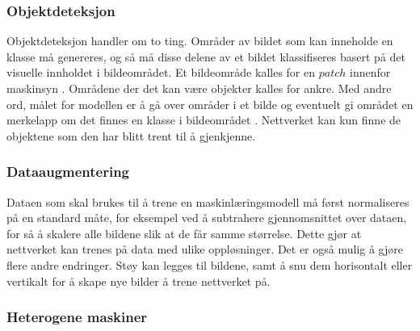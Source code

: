 \subsubsection{Objektdeteksjon}

Objektdeteksjon handler om to ting. Områder av bildet som kan inneholde en klasse må genereres, og så må disse delene av et bildet klassifiseres basert på det visuelle innholdet i bildeområdet. Et bildeområde kalles for en $patch$ innenfor maskinsyn \cite{LeCun m.fl. 1998 s. 23}. Områdene der det kan være objekter kalles for ankre. Med andre ord, målet for modellen er å gå over områder i et bilde og eventuelt gi området en merkelapp om det finnes en klasse i bildeområdet \cite{Jordan 2018}. Nettverket kan kun finne de objektene som den har blitt trent til å gjenkjenne.

\subsubsection{Dataaugmentering}

Dataen som skal brukes til å trene en maskinlæringsmodell må først normaliseres på en standard måte, for eksempel ved å subtrahere gjennomsnittet over dataen, for så å skalere alle bildene slik at de får samme størrelse. Dette gjør at nettverket kan trenes på data med ulike oppløsninger. Det er også mulig å gjøre flere andre endringer. Støy kan legges til bildene, samt å snu dem horisontalt eller vertikalt for å skape nye bilder å trene nettverket på. \cite{Cadieu m.fl. 2014 s. 15}

\subsubsection{Heterogene maskiner}


